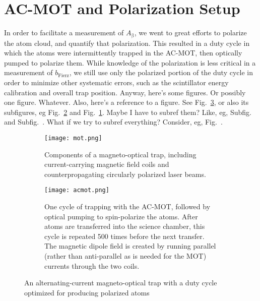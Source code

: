 \section{AC-MOT and Polarization Setup}
	In order to facilitate a measurement of $A_{\mathrm{\beta}}$, we went to great efforts to polarize the atom cloud, and quantify that polarization.  This resulted in a duty cycle in which the atoms were intermittently trapped in the AC-MOT, then optically pumped to polarize them.  While knowledge of the polarization is less critical in a measurement of $b_{\mathrm{Fierz}}$, we still use only the polarized portion of the duty cycle in order to minimize other systematic errors, such as the scintillator energy calibration and overall trap position.
	Anyway, here's some figures.  Or possibly one figure.  Whatever.  Also, here's a reference to a figure.  See Fig.~\ref*{fig:themot}, or also its subfigures, eg Fig.~\ref{fig:acmot} and Fig.~\ref{fig:mot}.  Maybe I have to subref them?  Like, eg, Subfig.~ and Subfig.~.  What if we try to subref everything?  Consider, eg, Fig.~.
	

	\begin{figure}[ht]
	\centering
		\begin{subfigure}[t]{0.242\textwidth}
			\centering
			\texttt{[image: mot.png]}
			\caption{Components of a magneto-optical trap, including current-carrying magnetic field coils and counterpropagating circularly polarized laser beams.}
			\label{fig:mot}
		\end{subfigure}
		\hfill
		\begin{subfigure}[t]{0.728\textwidth}
			\centering
			\texttt{[image: acmot.png]}
			\caption{One cycle of trapping with the AC-MOT, followed by optical pumping to spin-polarize the atoms.  After atoms are transferred into the science chamber, this cycle is repeated 500 times before the next transfer.  The magnetic dipole field is created by running parallel (rather than anti-parallel as is needed for the MOT) currents through the two coils.}
			\label{fig:acmot}
		\end{subfigure}
		\caption{An alternating-current magneto-optical trap with a duty cycle optimized for producing polarized atoms}	
		\label{fig:themot}
	\end{figure}
	
